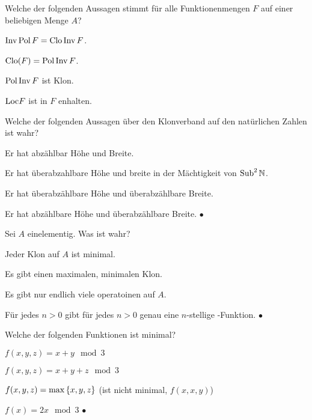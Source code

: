 \documentclass{book}
\begin{document}
\begin{exercise}
    Welche der folgenden Aussagen stimmt für alle Funktionenmengen $F$ auf einer beliebigen Menge $A$?
    \begin{tasks}
            \item $\mathop\mathrm{Inv}\mathop\mathrm{Pol} F=\mathrm{Clo}\mathop\mathrm{Inv} F$.
            \item $\mathrm{Clo}(F)=\mathop\mathrm{Pol}\mathop\mathrm{Inv} F$.
            \item $\mathop\mathrm{Pol}\mathop\mathrm{Inv} F$ ist Klon.
            \item $\mathrm{Loc} F$ ist in $F$ enhalten.
    \end{tasks}
\end{exercise}

\begin{exercise}
    Welche der folgenden Aussagen über den Klonverband auf den natürlichen Zahlen ist wahr?
    \begin{tasks}
        \item Er hat abzählbar Höhe und Breite.
        \item Er hat überabzahlbare Höhe und breite in der Mächtigkeit von $\mathop\mathrm{Sub}\nolimits^2 \mathbb{N}$.
        \item Er hat überabzählbare Höhe und überabzählbare Breite.
        \item Er hat abzählbare Höhe und überabzählbare Breite. $\bullet$
\end{tasks}
\end{exercise}

\begin{exercise}
    Sei $A$ einelementig. Was ist wahr?
    \begin{tasks}
            \item Jeder Klon auf $A$ ist minimal.
            \item Es gibt einen maximalen, minimalen Klon.
            \item Es gibt nur endlich viele operatoinen auf $A$.
            \item Für jedes $n>0$ gibt für jedes $n>0$ genau eine $n$-stellige -Funktion. $\bullet$
    \end{tasks}
\end{exercise}

\begin{exercise}
    Welche der folgenden Funktionen ist minimal?
    \begin{tasks}
            \item $f(x,y,z)=x+y \mod 3$
            \item $f(x,y,z)=x+y+z \mod 3$
            \item $f(x,y,z)=\max\left\{x,y,z\right\}$ (ist nicht minimal, $f(x,x,y)$)
            \item $f(x)=2x \mod 3$ $\bullet$
    \end{tasks}
\end{exercise}
\end{document}
